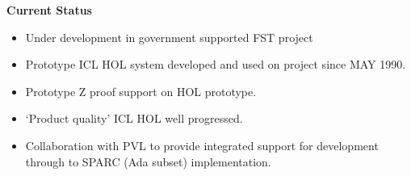 \begin{slide}{}

\begin{center}
{\bf Current Status}
\end{center}

\begin{itemize}
\item
Under development in government supported FST project

\item
Prototype ICL HOL system developed and used on project since MAY 1990.
\item
Prototype Z proof support on HOL prototype.
\item
`Product quality' ICL HOL well progressed.
\item
Collaboration with PVL to provide integrated support for development through to SPARC (Ada subset) implementation.
\end{itemize}

\end{slide}




